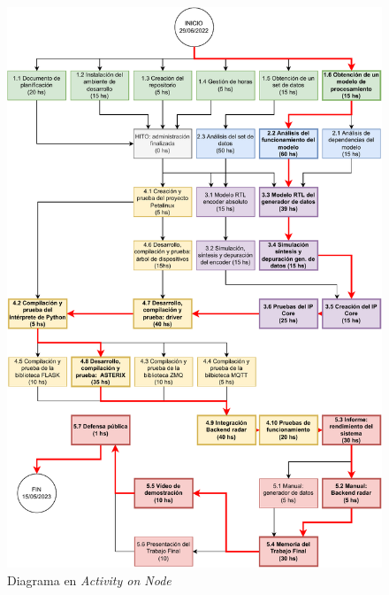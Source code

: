 \documentclass[
11pt, %
]{charter}
\begin{document}
\begin{figure}[H]
\centering 
\includegraphics[width=.9\textwidth]{./Figuras/AoN.pdf}
\caption{Diagrama en \textit{Activity on Node}}
\label{fig:AoN}
\end{figure}
\end{document}
